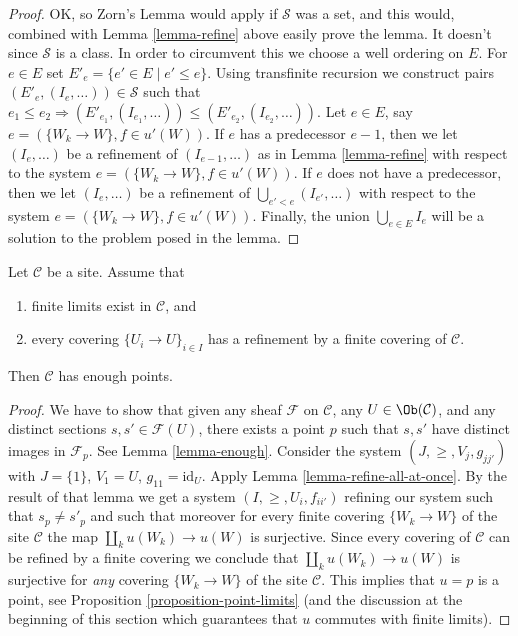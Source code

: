\begin{proof}
\medskip\noindent
OK, so Zorn's Lemma would apply if $\mathcal{S}$ was a set,
and this would, combined with Lemma \ref{lemma-refine} above easily prove
the lemma. It doesn't since $\mathcal{S}$ is a class. In order
to circumvent this we choose a well ordering on $E$.
For $e \in E$ set $E'_e = \{e' \in E \mid e' \leq e\}$.
Using transfinite recursion we construct pairs
$(E'_e, (I_e, \ldots)) \in \mathcal{S}$ such that
$e_1 \leq e_2 \Rightarrow (E'_{e_1}, (I_{e_1}, \ldots))
\leq (E'_{e_2}, (I_{e_2}, \ldots))$.
Let $e \in E$, say $e = (\{W_k \to W\}, f\in u'(W))$.
If $e$ has a predecessor $e - 1$, then we let
$(I_e, \ldots)$ be a refinement of $(I_{e - 1}, \ldots)$
as in Lemma \ref{lemma-refine} with respect to the system
$e = (\{W_k \to W\}, f\in u'(W))$.
If $e$ does not have a predecessor, then we let
$(I_e, \ldots)$ be a refinement of $\bigcup_{e' < e} (I_{e'}, \ldots)$
with respect to the system
$e = (\{W_k \to W\}, f\in u'(W))$.
Finally, the union $\bigcup_{e \in E} I_e$ will be a solution to
the problem posed in the lemma.
\end{proof}

\begin{proposition}
\label{proposition-criterion-points}
\begin{reference}
\cite[Expos\'e VI, Appendix by Deligne, Proposition 9.0]{SGA4}
\end{reference}
Let $\mathcal{C}$ be a site. Assume that
\begin{enumerate}
\item finite limits exist in $\mathcal{C}$, and
\item every covering $\{U_i \to U\}_{i \in I}$
has a refinement by a finite covering of $\mathcal{C}$.
\end{enumerate}
Then $\mathcal{C}$ has enough points.
\end{proposition}

\begin{proof}
We have to show that given any sheaf
$\mathcal{F}$ on $\mathcal{C}$, any $U \in \Ob(\mathcal{C})$,
and any distinct sections $s, s' \in \mathcal{F}(U)$, there exists
a point $p$ such that $s, s'$ have distinct images in
$\mathcal{F}_p$. See Lemma \ref{lemma-enough}.
Consider the system $(J, \geq, V_j, g_{jj'})$
with $J = \{1\}$, $V_1 = U$, $g_{11} = \text{id}_U$.
Apply Lemma \ref{lemma-refine-all-at-once}.
By the result of that lemma we get a system
$(I, \geq, U_i, f_{ii'})$ refining our system such
that $s_p \not = s'_p$ and such that moreover for every
finite covering $\{W_k \to W\}$ of the site $\mathcal{C}$ the map
$\coprod_k u(W_k) \to u(W)$ is surjective.
Since every covering of $\mathcal{C}$ can be refined by
a finite covering we conclude that
$\coprod_k u(W_k) \to u(W)$ is surjective for {\it any}
covering $\{W_k \to W\}$ of the site $\mathcal{C}$.
This implies that $u = p$ is a point, see
Proposition \ref{proposition-point-limits} (and the discussion
at the beginning of this section which guarantees that $u$
commutes with finite limits).
\end{proof}

